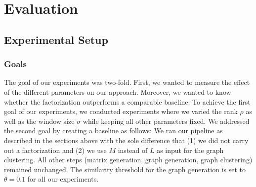 \documentclass{llncs}
\begin{document}
\section{Evaluation}

\label{sec:eval}

\subsection{Experimental Setup}

\subsubsection{Goals}
The goal of our experiments was two-fold. First, we wanted to measure the effect of the different parameters on our approach.
Moreover, we wanted to know whether the factorization outperforms a comparable baseline.
To achieve the first goal of our experiments, we conducted experiments where we varied the rank $\rho$ as well as the window size $\sigma$ while keeping all other parameters fixed.
We addressed the second goal by creating a baseline as follows: We ran our pipeline as described in the sections above with the sole difference that (1) we did not carry out a factorization and (2) we use $M$ instead of $L$ as input for the graph clustering. All other steps (matrix generation, graph generation, graph clustering) remained unchanged.
The similarity threshold for the graph generation is set to $\theta=0.1$ for all our experiments.
\end{document}
